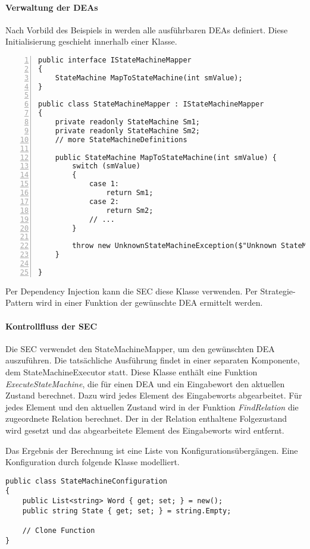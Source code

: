 \paragraph*{Verwaltung der DEAs}
Nach Vorbild des Beispiels in \label{code_simple_dea} werden alle ausführbaren DEAs definiert. Diese Initialisierung geschieht innerhalb einer Klasse. 

\begin{lstlisting}[language={[Sharp]C}, breaklines=true, tabsize=2, showstringspaces=false, frame=single, numbers=left, basicstyle=\small] 
public interface IStateMachineMapper 
{
	StateMachine MapToStateMachine(int smValue);
}

public class StateMachineMapper : IStateMachineMapper
{
	private readonly StateMachine Sm1;
	private readonly StateMachine Sm2;
	// more StateMachineDefinitions
	
	public StateMachine MapToStateMachine(int smValue) {
		switch (smValue) 
		{
			case 1:
				return Sm1;
			case 2: 
				return Sm2;
			// ...
		}
		
        throw new UnknownStateMachineException($"Unknown StateMachine for value [{smValue}].");
	}
	
}
\end{lstlisting}

Per Dependency Injection kann die SEC diese Klasse verwenden. Per Strategie-Pattern wird in einer Funktion der gewünschte DEA ermittelt werden.

\paragraph*{Kontrollfluss der SEC}
Die SEC verwendet den StateMachineMapper, um den gewünschten DEA auszuführen. Die tatsächliche Ausführung findet in einer separaten Komponente, dem StateMachineExecutor statt. Diese Klasse enthält eine Funktion \textit{ExecuteStateMachine}, die für einen DEA und ein Eingabewort den aktuellen Zustand berechnet. Dazu wird jedes Element des Eingabeworts abgearbeitet. Für jedes Element und den aktuellen Zustand wird in der Funktion \textit{FindRelation} die zugeordnete Relation berechnet. Der in der Relation enthaltene Folgezustand wird gesetzt und das abgearbeitete Element des Eingabeworts wird entfernt. 

Das Ergebnis der Berechnung ist eine Liste von Konfigurationsübergängen. Eine Konfiguration durch folgende Klasse modelliert.
\begin{lstlisting}[language={[Sharp]C}, breaklines=true, tabsize=2, showstringspaces=false, frame=single] 
public class StateMachineConfiguration
{
	public List<string> Word { get; set; } = new();
	public string State { get; set; } = string.Empty;
	
	// Clone Function
}
\end{lstlisting}

